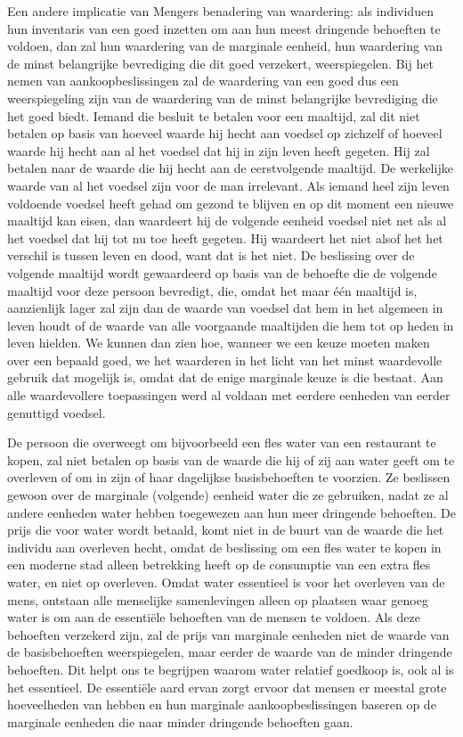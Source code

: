 Een andere implicatie van Mengers benadering van waardering: als individuen hun inventaris van een goed inzetten om aan hun meest dringende behoeften te voldoen, dan zal hun waardering van de marginale eenheid, hun waardering van de minst belangrijke bevrediging die dit goed verzekert, weerspiegelen. Bij het nemen van aankoopbeslissingen zal de waardering van een goed dus een weerspiegeling zijn van de waardering van de minst belangrijke bevrediging die het goed biedt. Iemand die besluit te betalen voor een maaltijd, zal dit niet betalen op basis van hoeveel waarde hij hecht aan voedsel op zichzelf of hoeveel waarde hij hecht aan al het voedsel dat hij in zijn leven heeft gegeten. Hij zal betalen naar de waarde die hij hecht aan de eerstvolgende maaltijd. De werkelijke waarde van al het voedsel zijn voor de man irrelevant. Als iemand heel zijn leven voldoende voedsel heeft gehad om gezond te blijven en op dit moment een nieuwe maaltijd kan eisen, dan waardeert hij de volgende eenheid voedsel niet net als al het voedsel dat hij tot nu toe heeft gegeten. Hij waardeert het niet alsof het het verschil is tussen leven en dood, want dat is het niet. De beslissing over de volgende maaltijd wordt gewaardeerd op basis van de behoefte die de volgende maaltijd voor deze persoon bevredigt, die, omdat het maar één maaltijd is, aanzienlijk lager zal zijn dan de waarde van voedsel dat hem in het algemeen in leven houdt of de waarde van alle voorgaande maaltijden die hem tot op heden in leven hielden. We kunnen dan zien hoe, wanneer we een keuze moeten maken over een bepaald goed, we het waarderen in het licht van het minst waardevolle gebruik dat mogelijk is, omdat dat de enige marginale keuze is die bestaat. Aan alle waardevollere toepassingen werd al voldaan met eerdere eenheden van eerder genuttigd voedsel. 

De persoon die overweegt om bijvoorbeeld een fles water van een restaurant te kopen, zal niet betalen op basis van de waarde die hij of zij aan water geeft om te overleven of om in zijn of haar dagelijkse basisbehoeften te voorzien. Ze beslissen gewoon over de marginale (volgende) eenheid water die ze gebruiken, nadat ze al andere eenheden water hebben toegewezen aan hun meer dringende behoeften. De prijs die voor water wordt betaald, komt niet in de buurt van de waarde die het individu aan overleven hecht, omdat de beslissing om een fles water te kopen in een moderne stad alleen betrekking heeft op de consumptie van een extra fles water, en niet op overleven. Omdat water essentieel is voor het overleven van de mens, ontstaan alle menselijke samenlevingen alleen op plaatsen waar genoeg water is om aan de essentiële behoeften van de mensen te voldoen. Als deze behoeften verzekerd zijn, zal de prijs van marginale eenheden niet de waarde van de basisbehoeften weerspiegelen, maar eerder de waarde van de minder dringende behoeften. Dit helpt ons te begrijpen waarom water relatief goedkoop is, ook al is het essentieel. De essentiële aard ervan zorgt ervoor dat mensen er meestal grote hoeveelheden van hebben en hun marginale aankoopbeslissingen baseren op de marginale eenheden die naar minder dringende behoeften gaan.

